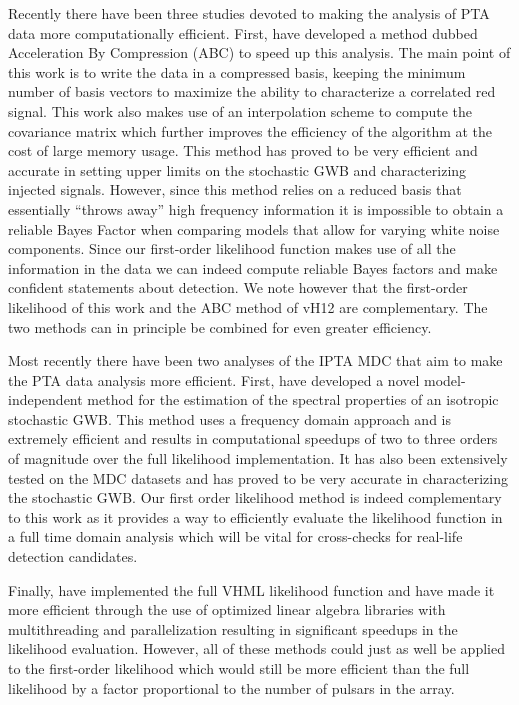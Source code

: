 \documentclass[iop]{emulateapj}
\begin{document}
Recently there have been three studies devoted to making the analysis of PTA data more computationally efficient. First, \citet[][hereafter vH12]{vh12} have developed a method dubbed Acceleration By Compression (ABC) to speed up this analysis. The main point of this work is to write the data in a compressed basis, keeping the minimum number of basis vectors to maximize the ability to characterize a correlated red signal. This work also makes use of an interpolation scheme to compute the covariance matrix which further improves the efficiency of the algorithm at the cost of large memory usage. This method has proved to be very efficient and accurate in setting upper limits on the stochastic GWB and characterizing injected signals. However, since this method relies on a reduced basis that essentially ``throws away'' high frequency information it is impossible to obtain a reliable Bayes Factor when comparing models that allow for varying white noise components. Since our first-order likelihood function makes use of all the information in the data we can indeed compute reliable Bayes factors and make confident statements about detection. 
We note however that the first-order likelihood of this work and the ABC method
of vH12 are complementary. The two methods can in principle be combined for even
greater efficiency.

Most recently there have been two analyses of the IPTA MDC that aim to make the PTA data analysis more efficient. First, \citet{Lentati:2012xb} have developed a novel model-independent method for the estimation of the spectral properties of an isotropic stochastic GWB. This method uses a frequency domain approach and is extremely efficient and results in computational speedups of two to three orders of magnitude over the full likelihood implementation. It has also been extensively tested on the MDC datasets and has proved to be very accurate in characterizing the stochastic GWB. Our first order likelihood method is indeed complementary to this work as it provides a way to efficiently evaluate the likelihood function in a full time domain analysis which will be vital for cross-checks for real-life detection candidates.

Finally, \citet{Taylor:2012vx} have implemented the full VHML likelihood function and have made it more efficient through the use of optimized linear algebra libraries with multithreading and parallelization resulting in significant speedups in the likelihood evaluation. However, all of these methods could just as well be applied to the first-order likelihood which would still be more efficient than the full likelihood by a factor proportional to the number of pulsars in the array. 
\end{document}
